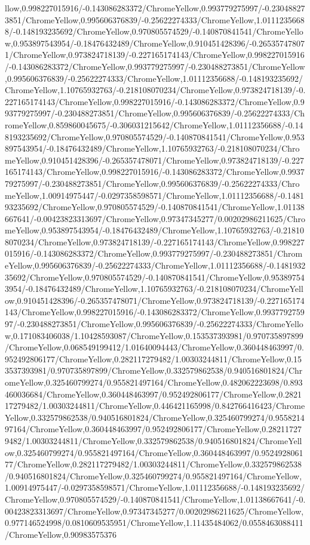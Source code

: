 {\begin{tikzternal}
{llow,0.998227015916/-0.143086283372/ChromeYellow,0.993779275997/-0.230488273851/ChromeYellow,0.995606376839/-0.25622274333/ChromeYellow,1.01112356688/-0.148193235692/ChromeYellow,0.970805574529/-0.140870841541/ChromeYellow,0.953897543954/-0.18476432489/ChromeYellow,0.910451428396/-0.265357478071/ChromeYellow,0.973824718139/-0.227165174143/ChromeYellow,0.998227015916/-0.143086283372/ChromeYellow,0.993779275997/-0.230488273851/ChromeYellow,0.995606376839/-0.25622274333/ChromeYellow,1.01112356688/-0.148193235692/ChromeYellow,1.10765932763/-0.218108070234/ChromeYellow,0.973824718139/-0.227165174143/ChromeYellow,0.998227015916/-0.143086283372/ChromeYellow,0.993779275997/-0.230488273851/ChromeYellow,0.995606376839/-0.25622274333/ChromeYellow,0.859860045675/-0.306031215642/ChromeYellow,1.01112356688/-0.148193235692/ChromeYellow,0.970805574529/-0.140870841541/ChromeYellow,0.953897543954/-0.18476432489/ChromeYellow,1.10765932763/-0.218108070234/ChromeYellow,0.910451428396/-0.265357478071/ChromeYellow,0.973824718139/-0.227165174143/ChromeYellow,0.998227015916/-0.143086283372/ChromeYellow,0.993779275997/-0.230488273851/ChromeYellow,0.995606376839/-0.25622274333/ChromeYellow,1.00914975447/-0.0297358598571/ChromeYellow,1.01112356688/-0.148193235692/ChromeYellow,0.970805574529/-0.140870841541/ChromeYellow,1.01138667641/-0.00423823313697/ChromeYellow,0.97347345277/0.00202986211625/ChromeYellow,0.953897543954/-0.18476432489/ChromeYellow,1.10765932763/-0.218108070234/ChromeYellow,0.973824718139/-0.227165174143/ChromeYellow,0.998227015916/-0.143086283372/ChromeYellow,0.993779275997/-0.230488273851/ChromeYellow,0.995606376839/-0.25622274333/ChromeYellow,1.01112356688/-0.148193235692/ChromeYellow,0.970805574529/-0.140870841541/ChromeYellow,0.953897543954/-0.18476432489/ChromeYellow,1.10765932763/-0.218108070234/ChromeYellow,0.910451428396/-0.265357478071/ChromeYellow,0.973824718139/-0.227165174143/ChromeYellow,0.998227015916/-0.143086283372/ChromeYellow,0.993779275997/-0.230488273851/ChromeYellow,0.995606376839/-0.25622274333/ChromeYellow,0.171083406038/1.10428593087/ChromeYellow,0.153537393981/0.970735897899/ChromeYellow,0.068549199412/1.01640094443/ChromeYellow,0.360448463997/0.952492806177/ChromeYellow,0.282117279482/1.00303244811/ChromeYellow,0.153537393981/0.970735897899/ChromeYellow,0.332579862538/0.940516801824/ChromeYellow,0.325460799274/0.955821497164/ChromeYellow,0.482062223698/0.893460036684/ChromeYellow,0.360448463997/0.952492806177/ChromeYellow,0.282117279482/1.00303244811/ChromeYellow,0.446421165998/0.842766416423/ChromeYellow,0.332579862538/0.940516801824/ChromeYellow,0.325460799274/0.955821497164/ChromeYellow,0.360448463997/0.952492806177/ChromeYellow,0.282117279482/1.00303244811/ChromeYellow,0.332579862538/0.940516801824/ChromeYellow,0.325460799274/0.955821497164/ChromeYellow,0.360448463997/0.952492806177/ChromeYellow,0.282117279482/1.00303244811/ChromeYellow,0.332579862538/0.940516801824/ChromeYellow,0.325460799274/0.955821497164/ChromeYellow,1.00914975447/-0.0297358598571/ChromeYellow,1.01112356688/-0.148193235692/ChromeYellow,0.970805574529/-0.140870841541/ChromeYellow,1.01138667641/-0.00423823313697/ChromeYellow,0.97347345277/0.00202986211625/ChromeYellow,0.977146524998/0.0810609535951/ChromeYellow,1.11435484062/0.0558463088411/ChromeYellow,0.90983575376}
\end{tikzternal}}
